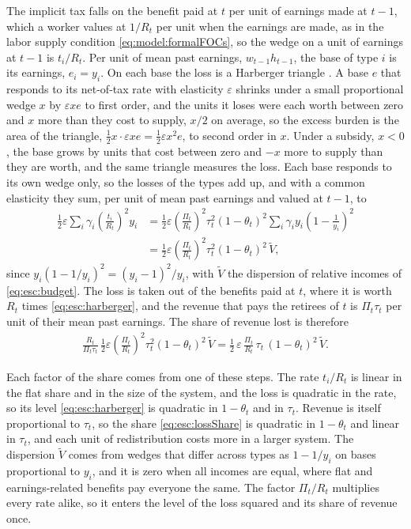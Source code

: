  The implicit tax falls on the benefit paid at $t$ per unit of earnings made at $t-1$, which a worker values at $1/R_t$ per unit when the earnings are made, as in the labor supply condition \eqref{eq:model:formalFOCs}, so the wedge on a unit of earnings at $t-1$ is $t_i/R_t$. Per unit of mean past earnings, $w_{t-1}h_{t-1}$, the base of type $i$ is its earnings, $e_i = y_i$. On each base the loss is a Harberger triangle \parencite{Harberger64a1}. A base $e$ that responds to its net-of-tax rate with elasticity $\varepsilon$ shrinks under a small proportional wedge $x$ by $\varepsilon xe$ to first order, and the units it loses were each worth between zero and $x$ more than they cost to supply, $x/2$ on average, so the excess burden is the area of the triangle, $\frac{1}{2}x\cdot\varepsilon xe = \frac{1}{2}\varepsilon x^2e$, to second order in $x$. Under a subsidy, $x<0$, the base grows by units that cost between zero and $-x$ more to supply than they are worth, and the same triangle measures the loss. Each base responds to its own wedge only, so the losses of the types add up, and with a common elasticity they sum, per unit of mean past earnings and valued at $t-1$, to
\begin{align}
    \frac{1}{2}\varepsilon\sum_i\gamma_i\left(\frac{t_i}{R_t}\right)^2y_i &= \frac{1}{2}\varepsilon\left(\frac{\Pi_t}{R_t}\right)^2\tau_t^2(1-\theta_t)^2\sum_i\gamma_iy_i\left(1-\frac{1}{y_i}\right)^2 \nonumber \\
    &= \frac{1}{2}\varepsilon\left(\frac{\Pi_t}{R_t}\right)^2\tau_t^2(1-\theta_t)^2\,\tilde{V}, \label{eq:esc:harberger}
\end{align}
since $y_i(1-1/y_i)^2 = (y_i-1)^2/y_i$, with $\tilde{V}$ the dispersion of relative incomes of \eqref{eq:esc:budget}. The loss is taken out of the benefits paid at $t$, where it is worth $R_t$ times \eqref{eq:esc:harberger}, and the revenue that pays the retirees of $t$ is $\Pi_t\tau_t$ per unit of their mean past earnings. The share of revenue lost is therefore
\begin{align}\label{eq:esc:lossShare}
    \frac{R_t}{\Pi_t\tau_t}\,\frac{1}{2}\varepsilon\left(\frac{\Pi_t}{R_t}\right)^2\tau_t^2(1-\theta_t)^2\,\tilde{V} = \frac{1}{2}\,\varepsilon\,\frac{\Pi_t}{R_t}\,\tau_t\,(1-\theta_t)^2\,\tilde{V}.
\end{align}

Each factor of the share comes from one of these steps. The rate $t_i/R_t$ is linear in the flat share and in the size of the system, and the loss is quadratic in the rate, so its level \eqref{eq:esc:harberger} is quadratic in $1-\theta_t$ and in $\tau_t$. Revenue is itself proportional to $\tau_t$, so the share \eqref{eq:esc:lossShare} is quadratic in $1-\theta_t$ and linear in $\tau_t$, and each unit of redistribution costs more in a larger system. The dispersion $\tilde{V}$ comes from wedges that differ across types as $1-1/y_i$ on bases proportional to $y_i$, and it is zero when all incomes are equal, where flat and earnings-related benefits pay everyone the same. The factor $\Pi_t/R_t$ multiplies every rate alike, so it enters the level of the loss squared and its share of revenue once.

